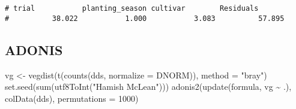 \documentclass[
]{article}
\newenvironment{Shaded}{\begin{snugshade}}{\end{snugshade}}
\newcommand{\AttributeTok}[1]{\textcolor[rgb]{0.77,0.63,0.00}{#1}}
\newcommand{\CommentTok}[1]{\textcolor[rgb]{0.56,0.35,0.01}{\textit{#1}}}
\newcommand{\ControlFlowTok}[1]{\textcolor[rgb]{0.13,0.29,0.53}{\textbf{#1}}}
\newcommand{\DecValTok}[1]{\textcolor[rgb]{0.00,0.00,0.81}{#1}}
\newcommand{\FunctionTok}[1]{\textcolor[rgb]{0.00,0.00,0.00}{#1}}
\newcommand{\NormalTok}[1]{#1}
\newcommand{\OtherTok}[1]{\textcolor[rgb]{0.56,0.35,0.01}{#1}}
\newcommand{\SpecialCharTok}[1]{\textcolor[rgb]{0.00,0.00,0.00}{#1}}
\newcommand{\StringTok}[1]{\textcolor[rgb]{0.31,0.60,0.02}{#1}}
\begin{document}
\begin{Shaded}
\end{Shaded}

\begin{verbatim}
# trial           planting_season cultivar        Residuals       
#          38.022           1.000           3.083          57.895
\end{verbatim}

\hypertarget{adonis}{%
\subsection{ADONIS}\label{adonis}}

\begin{Shaded}
\begin{Highlighting}[]
\NormalTok{vg }\OtherTok{\textless{}{-}} \FunctionTok{vegdist}\NormalTok{(}\FunctionTok{t}\NormalTok{(}\FunctionTok{counts}\NormalTok{(dds, }\AttributeTok{normalize =}\NormalTok{ DNORM)), }\AttributeTok{method =} \StringTok{"bray"}\NormalTok{)}
\FunctionTok{set.seed}\NormalTok{(}\FunctionTok{sum}\NormalTok{(}\FunctionTok{utf8ToInt}\NormalTok{(}\StringTok{"Hamish McLean"}\NormalTok{)))}
\FunctionTok{adonis2}\NormalTok{(}\FunctionTok{update}\NormalTok{(formula, vg }\SpecialCharTok{\textasciitilde{}}\NormalTok{ .), }\FunctionTok{colData}\NormalTok{(dds), }\AttributeTok{permutations =} \DecValTok{1000}\NormalTok{)}
\end{Highlighting}
\end{Shaded}
\end{document}
